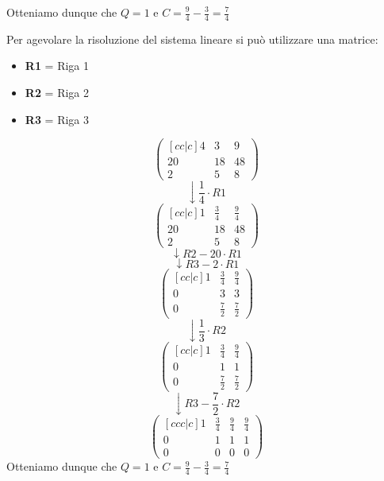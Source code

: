 \documentclass[a4paper]{article}
\theoremstyle{break}
\theoremstyle{break}
\theoremstyle{break}
\theoremstyle{break}
\begin{document}
\begin{example}
	\noindent Otteniamo dunque che \( Q = 1 \) e \( C = \frac{9}{4} - \frac{3}{4} = \frac{7}{4} \)

	\vspace{0.5cm}

	\noindent Per agevolare la risoluzione del sistema lineare si può utilizzare una matrice:
	\begin{itemize}
		\item \textbf{R1} = Riga 1
		\item \textbf{R2} = Riga 2
		\item \textbf{R3} = Riga 3
	\end{itemize}
	\[
		\begin{pmatrix}[cc|c]
			4  & 3  & 9  \\
			20 & 18 & 48 \\
			2  & 5  & 8
		\end{pmatrix}
	\]
	\[\downarrow \frac{1}{4} \cdot R1 \]
	\[
		\begin{pmatrix}[cc|c]
			1  & \frac{3}{4} & \frac{9}{4} \\
			20 & 18          & 48          \\
			2  & 5           & 8
		\end{pmatrix}
	\]
	\[
		\downarrow R2 - 20 \cdot R1
	\]
	\[
		\downarrow R3 - 2 \cdot R1
	\]
	\[
		\begin{pmatrix} [cc|c]
			1 & \frac{3}{4} & \frac{9}{4} \\
			0 & 3           & 3           \\
			0 & \frac{7}{2} & \frac{7}{2}
		\end{pmatrix}
	\]
	\[
		\downarrow \frac{1}{3} \cdot R2
	\]
	\[
		\begin{pmatrix}[cc|c]
			1 & \frac{3}{4} & \frac{9}{4} \\
			0 & 1           & 1           \\
			0 & \frac{7}{2} & \frac{7}{2}
		\end{pmatrix}
	\]
	\[
		\downarrow R3 - \frac{7}{2} \cdot R2
	\]
	\[
		\begin{pmatrix}[ccc|c]
			1 & \frac{3}{4} & \frac{9}{4} & \frac{9}{4} \\
			0 & 1           & 1           & 1           \\
			0 & 0           & 0           & 0
		\end{pmatrix}
	\]
	\noindent Otteniamo dunque che \( Q = 1 \) e \( C = \frac{9}{4} - \frac{3}{4} = \frac{7}{4} \)
\end{example}
\end{document}
